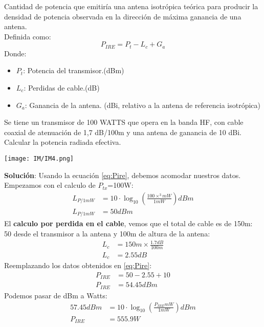 \documentclass[
	11pt, %
	fleqn, %
	a4paper, %
]{LegrandOrangeBook}
\begin{document}
\begin{definition}
Cantidad de potencia que emitiría una antena isotrópica teórica para producir la densidad de potencia observada en la dirección de máxima ganancia de una antena.\\
Definida como:
\begin{equation}
\label{eq:Pire}
P_{IRE}=P_t-L_c+G_a
\end{equation}
Donde:\\
\begin{itemize}
\item $P_t$: Potencia del transmisor.(dBm)
\item $L_c$: Perdidas de cable.(dB)
\item $G_a$: Ganancia de la antena. (dBi, relativo a la antena de referencia isotrópica)
\end{itemize}
\end{definition}
\begin{example}
Se tiene un transmisor de 100 WATTS que opera en la banda HF, con cable coaxial de atenuación de 1,7 dB/100m y una antena de ganancia de 10 dBi. Calcular la potencia radiada efectiva.\\
\begin{center}
\texttt{[image: IM/IM4.png]}
\end{center}
\textbf{Solución}:
Usando la ecuación \ref{eq:Pire}, debemos acomodar nuestros datos. Empezamos con el calculo de $P_{tx}$=100W:
\begin{align*}
L_{P/1mW}&=10\cdot \log_{10}\left(\frac{100\times ^3mW}{1mW}\right)dBm\\
L_{P/1mW}&=50dBm
\end{align*}
El \textbf{calculo por perdida en el cable}, vemos que el total de cable es de 150m: 50 desde el transmisor a la antena y 100m de altura de la antena:
\begin{align*}
L_c&=150m\times\frac{1.7dB}{100m}\\
L_c&=2.55dB
\end{align*}
Reemplazando los datos obtenidos en \ref{eq:Pire}:
\begin{align*}
P_{IRE}&=50-2.55+10\\
P_{IRE}&=54.45 dBm
\end{align*}
Podemos pasar de dBm a Watts:
\begin{align*}
57.45dBm&=10\cdot \log_{10}\left(\frac{P_{IRE}mW}{1mW}\right)dBm\\
P_{IRE}&=555.9 W
\end{align*}
\end{example}
\end{document}
